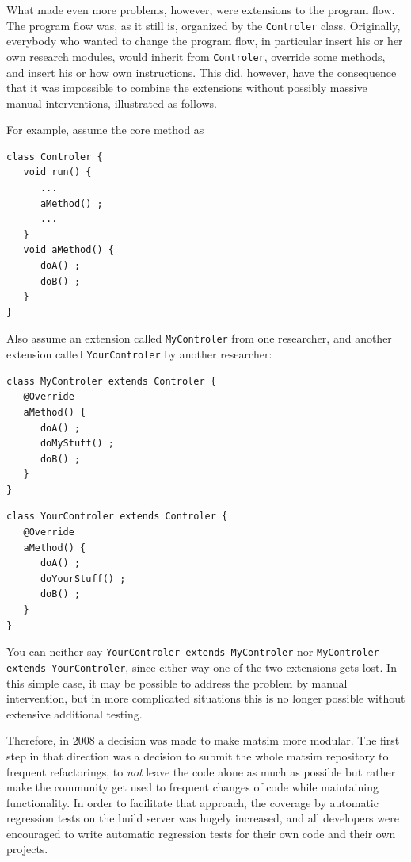 What made even more problems, however, were extensions to the program flow.  The program flow was, as it still is, organized by the \lstinline$Controler$ class.  Originally, everybody who wanted to change the program flow, in particular insert his or her own research \glspl{module}, would inherit from \lstinline$Controler$, override some methods, and insert his or how own instructions.  This did, however, have the consequence that it was impossible to combine the \glspl{extension} without possibly massive manual interventions, illustrated as follows.

For example, assume the core method as
\begin{lstlisting}
class Controler {
   void run() {
      ...
      aMethod() ;
      ...
   }
   void aMethod() {
      doA() ;
      doB() ;
   }
}
\end{lstlisting}
Also assume an extension called \protect\lstinline$MyControler$
from one researcher, and another extension called \protect\lstinline$YourControler$ by another researcher:
\begin{lstlisting}
class MyControler extends Controler {
   @Override
   aMethod() {
      doA() ;
      doMyStuff() ;
      doB() ;
   }
}
\end{lstlisting}
\begin{lstlisting}
class YourControler extends Controler {
   @Override
   aMethod() {
      doA() ;
      doYourStuff() ;
      doB() ;
   }
}  
\end{lstlisting}
%
You can neither say \protect\lstinline$YourControler extends MyControler$ nor \protect\lstinline$MyControler extends YourControler$, since either way one of the two extensions gets lost.  In this simple case, it may be possible to address the problem by manual intervention, but in more complicated situations this is no longer possible without extensive additional testing. %

Therefore, in 2008 a decision was made to make \gls{matsim} more modular.  The first step in that direction was a decision to submit the whole \gls{matsim} repository to frequent refactorings, \ie to \emph{not} leave the code alone as much as possible but rather make the community get used to frequent changes of code while maintaining functionality.  In order to facilitate that approach, the coverage by automatic regression tests on the build server was hugely increased, and all developers were encouraged to write automatic regression tests for their own code and their own projects. 

